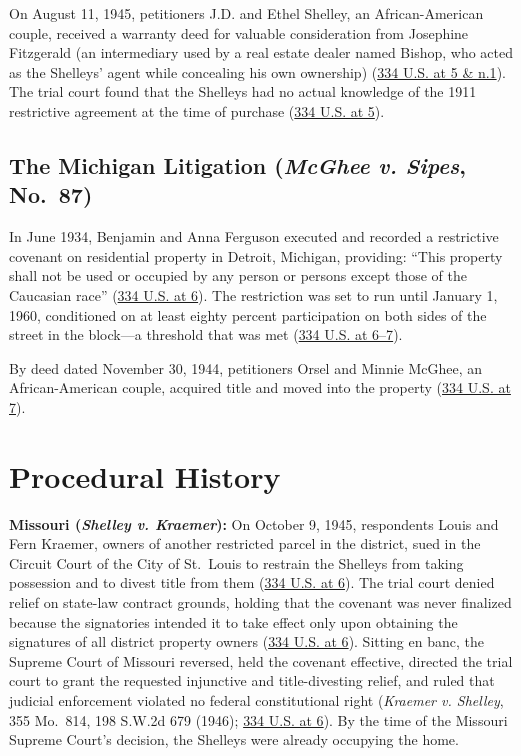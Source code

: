 \documentclass[12pt]{article}
\begin{document}
On August 11, 1945, petitioners J.D. and Ethel Shelley, an African-American couple, received a warranty deed for valuable consideration from Josephine Fitzgerald (an intermediary used by a real estate dealer named Bishop, who acted as the Shelleys' agent while concealing his own ownership) (\href{https://supreme.justia.com/cases/federal/us/334/1/}{334 U.S. at 5 \& n.1}). The trial court found that the Shelleys had no actual knowledge of the 1911 restrictive agreement at the time of purchase (\href{https://supreme.justia.com/cases/federal/us/334/1/}{334 U.S. at 5}).

\subsection{The Michigan Litigation (\textit{McGhee v. Sipes}, No.~87)}

In June 1934, Benjamin and Anna Ferguson executed and recorded a restrictive covenant on residential property in Detroit, Michigan, providing: ``This property shall not be used or occupied by any person or persons except those of the Caucasian race'' (\href{https://supreme.justia.com/cases/federal/us/334/1/}{334 U.S. at 6}). The restriction was set to run until January 1, 1960, conditioned on at least eighty percent participation on both sides of the street in the block---a threshold that was met (\href{https://supreme.justia.com/cases/federal/us/334/1/}{334 U.S. at 6--7}).

By deed dated November 30, 1944, petitioners Orsel and Minnie McGhee, an African-American couple, acquired title and moved into the property (\href{https://supreme.justia.com/cases/federal/us/334/1/}{334 U.S. at 7}).

\section{Procedural History}
\textbf{Missouri (\textit{Shelley v. Kraemer}):} On October 9, 1945, respondents Louis and Fern Kraemer, owners of another restricted parcel in the district, sued in the Circuit Court of the City of St.~Louis to restrain the Shelleys from taking possession and to divest title from them (\href{https://supreme.justia.com/cases/federal/us/334/1/}{334 U.S. at 6}). The trial court denied relief on state-law contract grounds, holding that the covenant was never finalized because the signatories intended it to take effect only upon obtaining the signatures of all district property owners (\href{https://supreme.justia.com/cases/federal/us/334/1/}{334 U.S. at 6}). Sitting en banc, the Supreme Court of Missouri reversed, held the covenant effective, directed the trial court to grant the requested injunctive and title-divesting relief, and ruled that judicial enforcement violated no federal constitutional right (\textit{Kraemer v. Shelley}, 355 Mo.~814, 198 S.W.2d 679 (1946); \href{https://supreme.justia.com/cases/federal/us/334/1/}{334 U.S. at 6}). By the time of the Missouri Supreme Court's decision, the Shelleys were already occupying the home.
\end{document}
